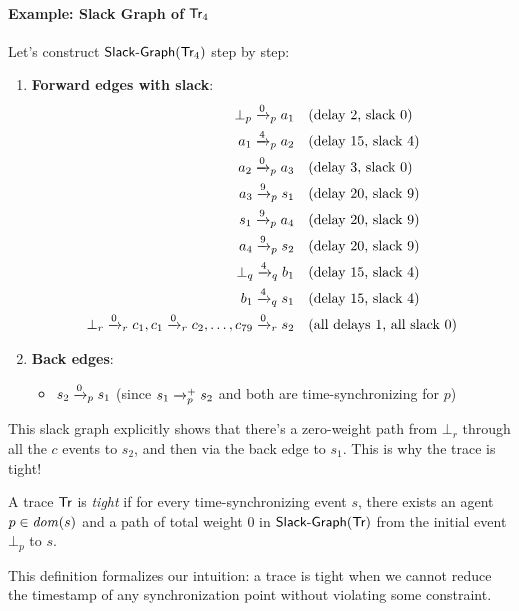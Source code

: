 \paragraph*{Example: Slack Graph of $\textsf{Tr}_4$}

Let's construct $\mathrm{\textsf{Slack-Graph}}(\textsf{Tr}_4)$ step by step:

\begin{enumerate}
\item \textbf{Forward edges with slack}:
  \begin{align*}
    \bot_p \xrightarrow{0}_p a_1 \quad &\text{(delay 2, slack 0)} \\
    a_1 \xrightarrow{4}_p a_2 \quad &\text{(delay 15, slack 4)} \\
    a_2 \xrightarrow{0}_p a_3 \quad &\text{(delay 3, slack 0)} \\
    a_3 \xrightarrow{9}_p s_1 \quad &\text{(delay 20, slack 9)} \\
    s_1 \xrightarrow{9}_p a_4 \quad &\text{(delay 20, slack 9)} \\
    a_4 \xrightarrow{9}_p s_2 \quad &\text{(delay 20, slack 9)} \\
    \bot_q \xrightarrow{4}_q b_1 \quad &\text{(delay 15, slack 4)} \\
    b_1 \xrightarrow{4}_q s_1 \quad &\text{(delay 15, slack 4)} \\
    \bot_r \xrightarrow{0}_r c_1, c_1 \xrightarrow{0}_r c_2, \ldots, c_{79} \xrightarrow{0}_r s_2 \quad &\text{(all delays 1, all slack 0)}
  \end{align*}

\item \textbf{Back edges}:
  \begin{itemize}
  \item $s_2 \xrightarrow{0}_p s_1$ (since $s_1 \xrightarrow{}_p^+ s_2$ and both are time-synchronizing for $p$)
  \end{itemize}
\end{enumerate}

This slack graph explicitly shows that there's a zero-weight path from $\bot_r$ through all the $c$ events to $s_2$, and then via the back edge to $s_1$. This is why the trace is tight!

\begin{definition}
A trace $\textsf{Tr}$ is \emph{tight} if for every time-synchronizing event $s$, there exists an agent $p \in \mathit{dom}(s)$ and a path of total weight 0 in $\mathrm{\textsf{Slack-Graph}}(\textsf{Tr})$ from the initial event $\bot_p$ to $s$.
\end{definition}

This definition formalizes our intuition: a trace is tight when we cannot reduce the timestamp of any synchronization point without violating some constraint.

